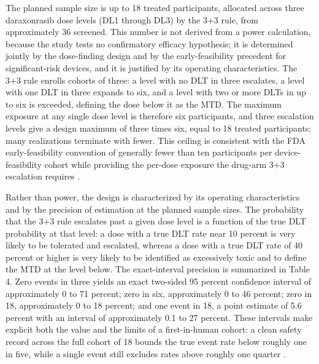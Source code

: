 The planned sample size is up to 18 treated participants, allocated across three
daraxonrasib dose levels (DL1 through DL3) by the 3+3 rule, from approximately 36
screened. This number is not derived from a power calculation, because the study
tests no confirmatory efficacy hypothesis; it is determined jointly by the
dose-finding design and by the early-feasibility precedent for significant-risk
devices, and it is justified by its operating characteristics. The 3+3 rule enrolls
cohorts of three: a level with no DLT in three escalates, a level with one DLT in
three expands to six, and a level with two or more DLTs in up to six is exceeded,
defining the dose below it as the MTD. The maximum exposure at any single dose level
is therefore six participants, and three escalation levels give a design maximum of
three times six, equal to 18 treated participants; many realizations terminate with
fewer. This ceiling is consistent with the FDA early-feasibility convention of
generally fewer than ten participants per device-feasibility cohort while providing
the per-dose exposure the drug-arm 3+3 escalation requires \cite{phase1guidance}.

Rather than power, the design is characterized by its operating characteristics and
by the precision of estimation at the planned sample sizes. The probability that the
3+3 rule escalates past a given dose level is a function of the true DLT probability
at that level: a dose with a true DLT rate near 10 percent is very likely to be
tolerated and escalated, whereas a dose with a true DLT rate of 40 percent or higher
is very likely to be identified as excessively toxic and to define the MTD at the
level below. The exact-interval precision is summarized in Table 4. Zero events in
three yields an exact two-sided 95 percent confidence interval of approximately 0 to
71 percent; zero in six, approximately 0 to 46 percent; zero in 18, approximately 0
to 18 percent; and one event in 18, a point estimate of 5.6 percent with an interval
of approximately 0.1 to 27 percent. These intervals make explicit both the value and
the limits of a first-in-human cohort: a clean safety record across the full cohort
of 18 bounds the true event rate below roughly one in five, while a single event
still excludes rates above roughly one quarter \cite{phase1guidance,ichpaistduni}.

